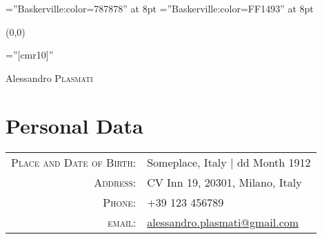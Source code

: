 \documentclass[a4paper,10pt]{article}
\begin{document}
\font\wm=''Baskerville:color=787878'' at 8pt
\font\wmweb=''Baskerville:color=FF1493'' at 8pt
{\wm 
	\begin{textblock}{1}(0,0)
	\end{textblock}
}

\pagestyle{empty} %

\font\fb=''[cmr10]'' %

\par{\centering
		{\Huge Alessandro \textsc{Plasmati}
	}\bigskip\par}

\section{Personal Data}

\begin{tabular}{rl}
    \textsc{Place and Date of Birth:} & Someplace, Italy  | dd Month 1912 \\
    \textsc{Address:}   & CV Inn 19, 20301, Milano, Italy \\
    \textsc{Phone:}     & +39 123 456789\\
    \textsc{email:}     & \href{mailto:alessandro.plasmati@gmail.com}{alessandro.plasmati@gmail.com}
\end{tabular}

\end{document}
